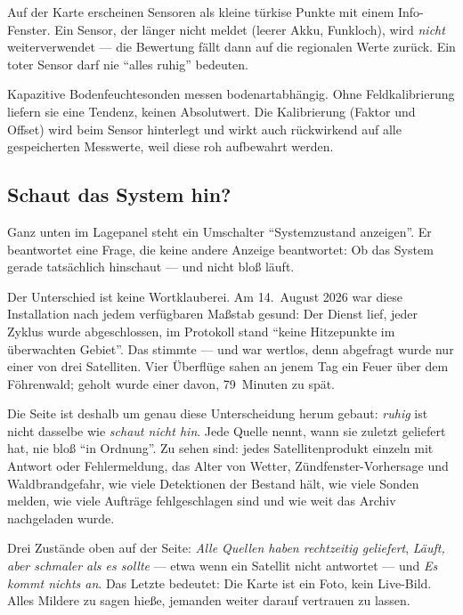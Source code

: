 \documentclass[11pt,a4paper,DIV=12,parskip=half]{scrartcl}
\begin{document}
Auf der Karte erscheinen Sensoren als kleine türkise Punkte mit einem
Info-Fenster. Ein Sensor, der länger nicht meldet (leerer Akku, Funkloch),
wird \emph{nicht} weiterverwendet --- die Bewertung fällt dann auf die
regionalen Werte zurück. Ein toter Sensor darf nie \enquote{alles ruhig}
bedeuten.

\begin{hinweis}[Kalibrierung]
Kapazitive Bodenfeuchtesonden messen bodenartabhängig. Ohne Feldkalibrierung
liefern sie eine Tendenz, keinen Absolutwert. Die Kalibrierung (Faktor und
Offset) wird beim Sensor hinterlegt und wirkt auch rückwirkend auf alle
gespeicherten Messwerte, weil diese roh aufbewahrt werden.
\end{hinweis}

\subsection{Schaut das System hin?}\label{sec:zustand}

Ganz unten im Lagepanel steht ein Umschalter \enquote{Systemzustand
anzeigen}. Er beantwortet eine Frage, die keine andere Anzeige beantwortet:
Ob das System gerade tatsächlich hinschaut --- und nicht bloß läuft.

Der Unterschied ist keine Wortklauberei. Am 14.~August 2026 war diese
Installation nach jedem verfügbaren Maßstab gesund: Der Dienst lief, jeder
Zyklus wurde abgeschlossen, im Protokoll stand \enquote{keine Hitzepunkte im
überwachten Gebiet}. Das stimmte --- und war wertlos, denn abgefragt wurde
nur einer von drei Satelliten. Vier Überflüge sahen an jenem Tag ein Feuer
über dem Föhrenwald; geholt wurde einer davon, 79~Minuten zu spät.

Die Seite ist deshalb um genau diese Unterscheidung herum gebaut:
\emph{ruhig} ist nicht dasselbe wie \emph{schaut nicht hin}. Jede Quelle
nennt, wann sie zuletzt geliefert hat, nie bloß \enquote{in Ordnung}. Zu
sehen sind: jedes Satellitenprodukt einzeln mit Antwort oder Fehlermeldung,
das Alter von Wetter, Zündfenster-Vorhersage und Waldbrandgefahr, wie viele
Detektionen der Bestand hält, wie viele Sonden melden, wie viele Aufträge
fehlgeschlagen sind und wie weit das Archiv nachgeladen wurde.

\begin{hinweis}
Drei Zustände oben auf der Seite: \emph{Alle Quellen haben rechtzeitig
geliefert}, \emph{Läuft, aber schmaler als es sollte} --- etwa wenn ein
Satellit nicht antwortet --- und \emph{Es kommt nichts an}. Das Letzte
bedeutet: Die Karte ist ein Foto, kein Live-Bild. Alles Mildere zu sagen
hieße, jemanden weiter darauf vertrauen zu lassen.
\end{hinweis}
\end{document}
